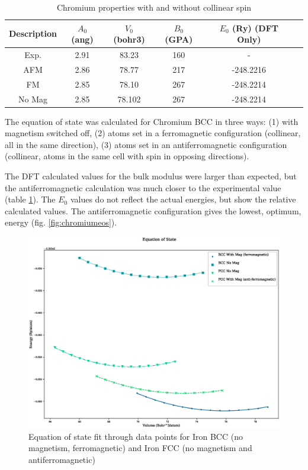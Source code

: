 \FloatBarrier
\begin{table}[h]
\begin{center}
\renewcommand{\arraystretch}{1.2}
\begin{tabular}{c c c c c c}
\hline\hline
Description & $A_0$ (ang) & $V_0$ (bohr3) & $B_0$ (GPA) & $E_0$ (Ry) (DFT Only) \\
\hline\hline
Exp. & 2.91 & 83.23 & 160 & - \\
AFM & 2.86 & 78.77 & 217 & -248.2216 \\
FM & 2.85 & 78.10 & 267 & -248.2214 \\
No Mag & 2.85 & 78.102 & 267 & -248.2214 \\
\hline\hline
\end{tabular}
\end{center}
\caption{Chromium properties with and without collinear spin}
\label{table:crproperties}
\end{table}
\FloatBarrier

The equation of state was calculated for Chromium BCC in three ways: (1) with magnetism switched off, (2) atoms set in a ferromagnetic configuration (collinear, all in the same direction), (3) atoms set in an antiferromagnetic configuration (collinear, atoms in the same cell with spin in opposing directions).  

The DFT calculated values for the bulk modulus were larger than expected, but the antiferromagnetic calculation was much closer to the experimental value (table \ref{table:crproperties}).  The $E_0$ values do not reflect the actual energies, but show the relative calculated values.  The antiferromagnetic configuration gives the lowest, optimum, energy (fig. \ref{fig:chromiumeos}).

\FloatBarrier
\begin{figure}[h]
\begin{center}
\includegraphics[scale=0.45]{chapters/potentials_fe_pd_ru/qeeos_plots/fe-mag/iron_eos_comparison.eps}
\caption{Equation of state fit through data points for Iron BCC (no magnetism, ferromagnetic) and Iron FCC (no magnetism and antiferromagnetic)}
\end{center}
\label{fig:iron_bcc_fcc_eos}
\end{figure}
\FloatBarrier


